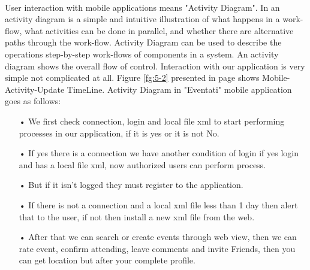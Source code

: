 \documentclass[12pt,a4paper,class,twoside,openany]{report}
\begin{document}
{\paragraph*{\hspace{.9 cm} } User interaction with mobile applications means "Activity Diagram". In an activity diagram is a simple and intuitive illustration of what happens in a work-flow, what activities can be done in parallel, and whether there are alternative paths through the work-flow. Activity Diagram can be used to describe the operations step-by-step work-flows of components in a system. An activity diagram shows the overall flow of control. Interaction with our application is very simple not complicated at all. Figure \ref{fg:5-2} presented in page \pageref{fg:5-2}shows Mobile-Activity-Update TimeLine.
Activity Diagram in "Eventati" mobile application goes as follows: 
\begin{itemize}
\item[•]We first check connection, login and local file xml to start performing processes in our application, if it is yes or it is not No.
\item[•]If yes there is a connection we have another condition of login if yes login and has a local file xml, now authorized users can perform process.
\item[•] But if it isn't logged they must register to the application.
\item[•] If there is not a connection and a local xml file less than 1 day then alert that to the user, if not then install a new xml file from the web.
\item[•] After that we can search or create events through web view, then we can rate event, confirm attending, leave comments and invite Friends, then you can get location but after your complete profile.
\end{itemize}

}
\end{document}
